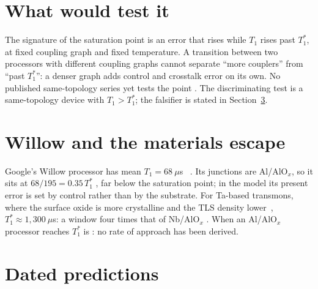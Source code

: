\section{What would test it}

The signature of the saturation point is an error that rises while $T_1$ rises past $T_1^*$, at fixed coupling graph and fixed
temperature. A transition between two processors with different coupling graphs cannot separate ``more couplers'' from ``past $T_1^*$'':
a denser graph adds control and crosstalk error on its own. No published same-topology series yet tests the point \openprob. The
discriminating test is a same-topology device with $T_1>T_1^*$; the falsifier is stated in Section~\ref{sec:walls_pred}.

\section{Willow and the materials escape}

Google's Willow processor has mean $T_1=68\ \mu$s~\cite{GoogleWillow2025} \observed. Its junctions are Al/AlO$_x$, so it sits at
$68/195=0.35\,T_1^*$ \calc, far below the saturation point; in the model its present error is set by control rather than by the substrate.
For Ta-based transmons, where the surface oxide is more crystalline and the TLS density lower~\cite{Place2021,Wang2022Ta},
$T_1^*\approx1{,}300\ \mu$s: a window four times that of Nb/AlO$_x$ \calc. When an Al/AlO$_x$ processor reaches $T_1^*$ is
\openprob: no rate of approach has been derived.

\section{Dated predictions}\label{sec:walls_pred}


